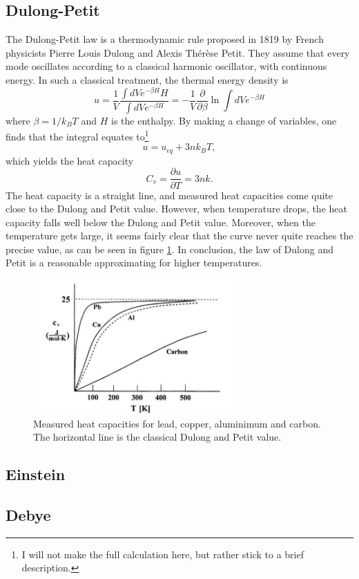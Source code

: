 \documentclass[11pt]{amsart}
\begin{document}
\subsection{Dulong-Petit}
The Dulong-Petit law is a thermodynamic rule proposed in 1819 by French physicists Pierre Louis Dulong and Alexis Thérèse Petit. They assume that every mode oscillates according to a classical harmonic oscillator, with continuous energy. In such a classical treatment, the thermal energy density is
\begin{equation}
u = \frac{1}{V}\frac{\int dV e^{-\beta H}H}{\int dV e^{-\beta H}} = -\frac{1}{V}\frac{\partial}{\partial \beta}\ln \int dV e^{-\beta H}
\end{equation}
where $\beta = 1/k_BT$ and $H$ is the enthalpy. By making a change of variables, one finds that the integral equates to\footnote{I will not make the full calculation here, but rather stick to a brief description.}
\begin{equation}
u = u_{eq} + 3nk_BT,
\end{equation}
which yields the heat capacity
\begin{equation}
C_v = \frac{\partial u}{\partial T} = 3nk.
\end{equation}
The heat capacity is a straight line, and measured heat capacities come quite close to the Dulong and Petit value. However, when temperature drops, the heat capacity falls well below the Dulong and Petit value. Moreover, when the temperature gets large, it seems fairly clear that the curve never quite reaches the precise value, as can be seen in figure 		\ref{fig:dulongpetit}. In conclusion, the law of Dulong and Petit is a reasonable approximating for higher temperatures.

\begin{figure}
\centering
	\includegraphics[width = 0.7\textwidth]{dulong_petit.jpg}
	\caption{Measured heat capacities for lead, copper, aluminimum and carbon. The horizontal line is the classical Dulong and Petit value.}
	\label{fig:dulongpetit}
\end{figure}

\subsection{Einstein}



\subsection{Debye}
\end{document}
